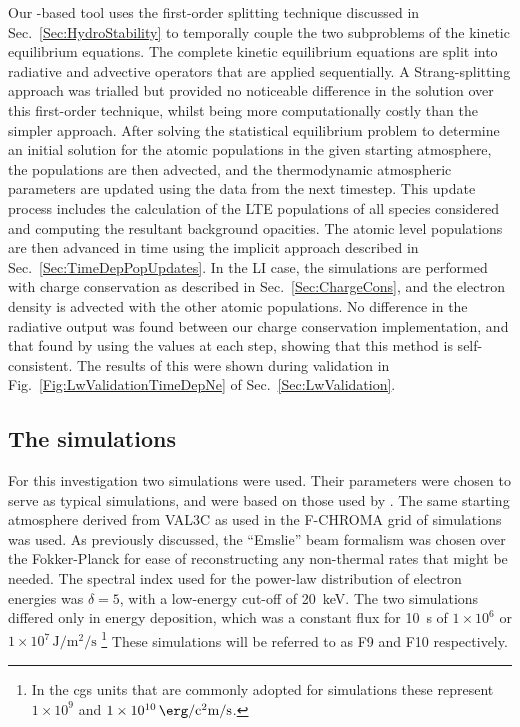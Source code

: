 Our \Lw{}-based tool uses the first-order splitting technique discussed in Sec.~\ref{Sec:HydroStability} to temporally couple the two subproblems of the kinetic equilibrium equations.
The complete kinetic equilibrium equations are split into radiative and advective operators that are applied sequentially.
A Strang-splitting approach was trialled but provided no noticeable difference in the solution over this first-order technique, whilst being more computationally costly than the simpler approach.
After solving the statistical equilibrium problem to determine an initial solution for the atomic populations in the given starting atmosphere, the populations are then advected, and the thermodynamic atmospheric parameters are updated using the \Radyn{} data from the next timestep.
This update process includes the calculation of the LTE populations of all species considered and computing the resultant background opacities.
The atomic level populations are then advanced in time using the implicit approach described in Sec.~\ref{Sec:TimeDepPopUpdates}.
In the LI case, the simulations are performed with charge conservation as described in Sec.~\ref{Sec:ChargeCons}, and the electron density is advected with the other atomic populations.
No difference in the radiative output was found between our charge conservation implementation, and that found by using the \Radyn{} values at each step, showing that this method is self-consistent.
The results of this were shown during \Lw{} validation in Fig.~\ref{Fig:LwValidationTimeDepNe} of Sec.~\ref{Sec:LwValidation}.

\subsection{The \Radyn{} simulations}\label{Sec:CaiiRadynSims}

For this investigation two \Radyn{} simulations were used.
Their parameters were chosen to serve as typical simulations, and were based on those used by \citet{Kerr2019, Kerr2019a}.
The same starting atmosphere derived from VAL3C \citep{Vernazza1981} as used in the F-CHROMA grid of simulations was used.
As previously discussed, the ``Emslie'' beam formalism was chosen over the Fokker-Planck for ease of reconstructing any non-thermal rates that might be needed.
The spectral index used for the power-law distribution of electron energies was $\delta=5$, with a low-energy cut-off of \SI{20}{\kilo\electronvolt}.
The two simulations differed only in energy deposition, which was a constant flux for \SI{10}{\second} of $1\times{}10^{6}$ or $1\times{}10^{7}\,\si{\joule\per\square\metre\per\second}$ \footnote{In the cgs units that are commonly adopted for \Radyn{} simulations these represent $1\times{}10^9$ and $1\times{}10^{10}\,\si{\erg\per\square\centi\metre\per\second}$.}
These simulations will be referred to as F9 and F10 respectively.

